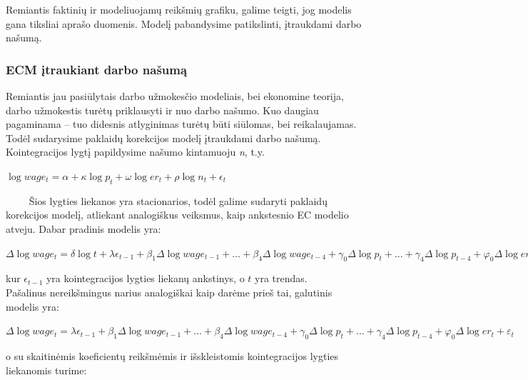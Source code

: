\documentclass[12pt,a4paper]{article}
\theoremstyle{change}\newtheorem{salyga}{Uždavinys}
\begin{document}
Remiantis faktinių ir modeliuojamų reikšmių grafiku, galime teigti, jog modelis gana tiksliai aprašo duomenis. Modelį pabandysime patikslinti, įtraukdami darbo našumą.





\subsubsection{ECM įtraukiant darbo našumą}
\hspace{40pt}Remiantis jau pasiūlytais darbo užmokesčio modeliais, bei ekonomine teorija, darbo užmokestis turėtų priklausyti ir nuo darbo našumo. Kuo daugiau pagaminama – tuo didesnis atlyginimas turėtų būti siūlomas, bei reikalaujamas. Todėl sudarysime paklaidų korekcijos modelį įtraukdami darbo našumą. 
\vskip 8pt 
$\qquad$Kointegracijos lygtį papildysime našumo kintamuoju \textit{n}, t.y. 
\vskip 8pt      
\begin{center}
\large$ \log wage_t=\alpha + \kappa\log p_t + \omega\log er_t + \rho\log n_t + \epsilon_t $ 
\end{center} 
\vskip 8pt   
$\qquad$ Šios lygties liekanos yra stacionarios, todėl galime sudaryti paklaidų korekcijos modelį, atliekant analogiškus veiksmus, kaip ankstesnio EC modelio atveju. Dabar pradinis modelis yra:     
     
     
\begin{center}
\large$ \Delta \log wage_t = \delta\log t + \lambda \epsilon_{t-1} + \beta_1\Delta \log wage_{t-1}+ \ldots + \beta_4\Delta \log wage_{t-4}+\gamma_0 \Delta \log p_{t}+\ldots +\gamma_4 \Delta \log p_{t-4}+\varphi_0 \Delta \log er_{t}+\ldots +\varphi_4 \Delta \log er_{t-4}+\psi_0 \Delta \log n_{t}+\ldots +\psi_4 \Delta \log n_{t-4} + \varepsilon_t$  
\end{center}
kur $ \epsilon_{t-1} $ yra kointegracijos lygties liekanų ankstinys, o $ t $ yra trendas.
\vskip 8pt       
$\qquad$Pašalinus nereikšmingus narius analogiškai kaip darėme prieš tai, galutinis modelis yra: 
\begin{center}
\large$ \Delta \log wage_t =  \lambda \epsilon_{t-1} + \beta_1\Delta \log wage_{t-1}+ \ldots + \beta_4\Delta \log wage_{t-4}+\gamma_0 \Delta \log p_{t}+\ldots +\gamma_4 \Delta \log p_{t-4}+\varphi_0 \Delta \log er_{t} + \varepsilon_t$  
\end{center}
  
     
o su skaitinėmis koeficientų reikšmėmis ir išskleistomis kointegracijos lygties liekanomis turime:   
\end{document}
